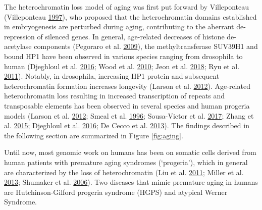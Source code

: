 \documentclass[onehalf,12pt]{beavtex}
\begin{document}
  The heterochromatin loss model of aging was first put forward by
  Villeponteau (Villeponteau
  \protect\hyperlink{ref-Villeponteauheterochromatinlossmodel1997}{1997}),
  who proposed that the heterochromatin domains established in
  embryogenesis are perturbed during aging, contributing to the aberrant
  de-repression of silenced genes. In general, age-related decreases of
  histone de-acetylase components (Pegoraro et al.
  \protect\hyperlink{ref-PegoraroAgeingrelatedchromatindefects2009}{2009}),
  the methyltransferase SUV39H1 and bound HP1 have been observed in
  various species ranging from drosophila to human (Djeghloul et al.
  \protect\hyperlink{ref-DjeghloulAgeAssociatedDecreaseHistone2016}{2016};
  Wood et al.
  \protect\hyperlink{ref-WoodChromatinremodelingaging2010}{2010}; Jeon et
  al.
  \protect\hyperlink{ref-JeonEffectheterochromatinstability2018}{2018};
  Ryu et al.
  \protect\hyperlink{ref-RyuTranscriptionalrepressionrepeatderived2011}{2011}).
  Notably, in drosophila, increasing HP1 protein and subsequent
  heterochromatin formation increases longevity (Larson et al.
  \protect\hyperlink{ref-LarsonHeterochromatinformationpromotes2012}{2012}).
  Age-related heterochromatin loss resulting in increased transcription of
  repeats and transposable elements has been observed in several species
  and human progeria models (Larson et al.
  \protect\hyperlink{ref-LarsonHeterochromatinformationpromotes2012}{2012};
  Smeal et al.
  \protect\hyperlink{ref-SmealLosstranscriptionalsilencing1996}{1996};
  Sousa-Victor et al.
  \protect\hyperlink{ref-Sousa-VictorPiwiRequiredLimit2017}{2017}; Zhang
  et al. \protect\hyperlink{ref-ZhangWernersyndromestem2015}{2015};
  Djeghloul et al.
  \protect\hyperlink{ref-DjeghloulAgeAssociatedDecreaseHistone2016}{2016};
  De Cecco et al.
  \protect\hyperlink{ref-DeCeccoGenomesreplicativelysenescent2013}{2013}).
  The findings described in the following section are summarized in Figure
  \ref{fig:aging}.
  
  \FloatBarrier
  \clearpage
  
  Until now, most genomic work on humans has been on somatic cells derived
  from human patients with premature aging syndromes (`progeria'), which
  in general are characterized by the loss of heterochromatin (Liu et al.
  \protect\hyperlink{ref-LiuRecapitulationprematureageing2011}{2011};
  Miller et al.
  \protect\hyperlink{ref-MillerHumaniPSCbasedmodeling2013}{2013}; Shumaker
  et al. \protect\hyperlink{ref-ShumakerMutantnuclearlamin2006}{2006}).
  Two diseases that mimic premature aging in humans are Hutchinson-Gilford
  progeria syndrome (HGPS) and atypical Werner Syndrome.
  
\end{document}
